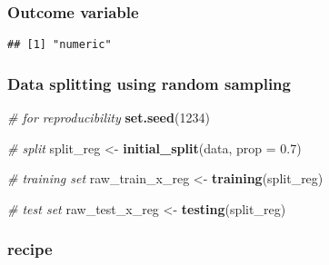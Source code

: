 \documentclass[
]{book}
\newenvironment{Shaded}{\begin{snugshade}}{\end{snugshade}}
\newcommand{\CommentTok}[1]{\textcolor[rgb]{0.56,0.35,0.01}{\textit{#1}}}
\newcommand{\DataTypeTok}[1]{\textcolor[rgb]{0.13,0.29,0.53}{#1}}
\newcommand{\DecValTok}[1]{\textcolor[rgb]{0.00,0.00,0.81}{#1}}
\newcommand{\FloatTok}[1]{\textcolor[rgb]{0.00,0.00,0.81}{#1}}
\newcommand{\KeywordTok}[1]{\textcolor[rgb]{0.13,0.29,0.53}{\textbf{#1}}}
\newcommand{\NormalTok}[1]{#1}
\newcommand{\OperatorTok}[1]{\textcolor[rgb]{0.81,0.36,0.00}{\textbf{#1}}}
\newcommand{\StringTok}[1]{\textcolor[rgb]{0.31,0.60,0.02}{#1}}
\begin{document}
\hypertarget{outcome-variable}{%
\subsubsection{Outcome variable}\label{outcome-variable}}

\begin{Shaded}
\end{Shaded}

\begin{verbatim}
## [1] "numeric"
\end{verbatim}

\hypertarget{data-splitting-using-random-sampling}{%
\subsubsection{Data splitting using random sampling}\label{data-splitting-using-random-sampling}}

\begin{Shaded}
\begin{Highlighting}[]
\CommentTok{\# for reproducibility}
\KeywordTok{set.seed}\NormalTok{(}\DecValTok{1234}\NormalTok{)}

\CommentTok{\# split}
\NormalTok{split\_reg \textless{}{-}}\StringTok{ }\KeywordTok{initial\_split}\NormalTok{(data, }\DataTypeTok{prop =} \FloatTok{0.7}\NormalTok{)}

\CommentTok{\# training set}
\NormalTok{raw\_train\_x\_reg \textless{}{-}}\StringTok{ }\KeywordTok{training}\NormalTok{(split\_reg)}

\CommentTok{\# test set}
\NormalTok{raw\_test\_x\_reg \textless{}{-}}\StringTok{ }\KeywordTok{testing}\NormalTok{(split\_reg)}
\end{Highlighting}
\end{Shaded}

\hypertarget{recipe}{%
\subsubsection{recipe}\label{recipe}}
\end{document}
